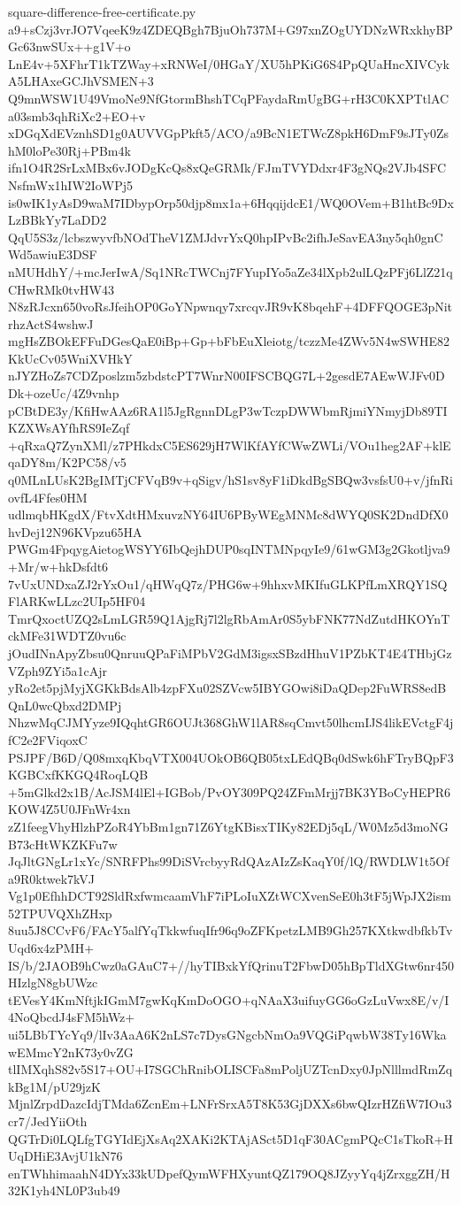 \documentclass[11pt]{article}
\theoremstyle{definition}
\theoremstyle{remark}
\begin{document}
\begin{filecontents*}[overwrite]{square-difference-free-certificate.py}
a9+sCzj3vrJO7VqeeK9z4ZDEQBgh7BjuOh737M+G97xnZOgUYDNzWRxkhyBPGc63nwSUx++g1V+o
LnE4v+5XFhrT1kTZWay+xRNWeI/0HGaY/XU5hPKiG6S4PpQUaHncXIVCykA5LHAxeGCJhVSMEN+3
Q9mnWSW1U49VmoNe9NfGtormBhshTCqPFaydaRmUgBG+rH3C0KXPTtlACa03smb3qhRiXc2+EO+v
xDGqXdEVznhSD1g0AUVVGpPkft5/ACO/a9BcN1ETWcZ8pkH6DmF9sJTy0ZshM0loPe30Rj+PBm4k
ifn1O4R2SrLxMBx6vJODgKcQs8xQeGRMk/FJmTVYDdxr4F3gNQs2VJb4SFCNsfmWx1hIW2IoWPj5
is0wIK1yAsD9waM7IDbypOrp50djp8mx1a+6HqqijdcE1/WQ0OVem+B1htBc9DxLzBBkYy7LaDD2
QqU5S3z/lcbszwyvfbNOdTheV1ZMJdvrYxQ0hpIPvBc2ifhJeSavEA3ny5qh0gnCWd5awiuE3DSF
nMUHdhY/+mcJerIwA/Sq1NRcTWCnj7FYupIYo5aZe34lXpb2ulLQzPFj6LlZ21qCHwRMk0tvHW43
N8zRJcxn650voRsJfeihOP0GoYNpwnqy7xrcqvJR9vK8bqehF+4DFFQOGE3pNitrhzActS4wshwJ
mgHsZBOkEFFuDGesQaE0iBp+Gp+bFbEuXleiotg/tczzMe4ZWv5N4wSWHE82KkUcCv05WniXVHkY
nJYZHoZs7CDZposlzm5zbdstcPT7WnrN00IFSCBQG7L+2gesdE7AEwWJFv0DDk+ozeUc/4Z9vnhp
pCBtDE3y/KfiHwAAz6RA1l5JgRgnnDLgP3wTczpDWWbmRjmiYNmyjDb89TIKZXWsAYfhRS9IeZqf
+qRxaQ7ZynXMl/z7PHkdxC5ES629jH7WlKfAYfCWwZWLi/VOu1heg2AF+klEqaDY8m/K2PC58/v5
q0MLnLUsK2BgIMTjCFVqB9v+qSigv/hS1sv8yF1iDkdBgSBQw3vsfsU0+v/jfnRiovfL4Ffes0HM
udlmqbHKgdX/FtvXdtHMxuvzNY64IU6PByWEgMNMc8dWYQ0SK2DndDfX0hvDej12N96KVpzu65HA
PWGm4FpqygAietogWSYY6IbQejhDUP0sqINTMNpqyIe9/61wGM3g2Gkotljva9+Mr/w+hkDsfdt6
7vUxUNDxaZJ2rYxOu1/qHWqQ7z/PHG6w+9hhxvMKIfuGLKPfLmXRQY1SQFlARKwLLzc2UIp5HF04
TmrQxoctUZQ2sLmLGR59Q1AjgRj7l2lgRbAmAr0S5ybFNK77NdZutdHKOYnTckMFe31WDTZ0vu6c
jOudINnApyZbsu0QnruuQPaFiMPbV2GdM3igsxSBzdHhuV1PZbKT4E4THbjGzVZph9ZYi5a1cAjr
yRo2et5pjMyjXGKkBdsAlb4zpFXu02SZVcw5IBYGOwi8iDaQDep2FuWRS8edBQnL0wcQbxd2DMPj
NhzwMqCJMYyze9IQqhtGR6OUJt368GhW1lAR8sqCmvt50lhcmIJS4likEVctgF4jfC2e2FViqoxC
PSJPF/B6D/Q08mxqKbqVTX004UOkOB6QB05txLEdQBq0dSwk6hFTryBQpF3KGBCxfKKGQ4RoqLQB
+5mGlkd2x1B/AcJSM4lEl+IGBob/PvOY309PQ24ZFmMrjj7BK3YBoCyHEPR6KOW4Z5U0JFnWr4xn
zZ1feegVhyHlzhPZoR4YbBm1gn71Z6YtgKBisxTIKy82EDj5qL/W0Mz5d3moNGB73cHtWKZKFu7w
JqJltGNgLr1xYc/SNRFPhs99DiSVrcbyyRdQAzAIzZsKaqY0f/lQ/RWDLW1t5Ofa9R0ktwek7kVJ
Vg1p0EfhhDCT92SldRxfwmcaamVhF7iPLoIuXZtWCXvenSeE0h3tF5jWpJX2ism52TPUVQXhZHxp
8uu5J8CCvF6/FAcY5alfYqTkkwfuqIfr96q9oZFKpetzLMB9Gh257KXtkwdbfkbTvUqd6x4zPMH+
IS/b/2JAOB9hCwz0aGAuC7+//hyTIBxkYfQrinuT2FbwD05hBpTldXGtw6nr450HIzlgN8gbUWzc
tEVesY4KmNftjkIGmM7gwKqKmDoOGO+qNAaX3uifuyGG6oGzLuVwx8E/v/I4NoQbcdJ4sFM5hWz+
ui5LBbTYcYq9/lIv3AaA6K2nLS7c7DysGNgcbNmOa9VQGiPqwbW38Ty16WkawEMmcY2nK73y0vZG
tlIMXqhS82v5S17+OU+I7SGChRnibOLISCFa8mPoljUZTcnDxy0JpNlllmdRmZqkBg1M/pU29jzK
MjnlZrpdDazcIdjTMda6ZcnEm+LNFrSrxA5T8K53GjDXXs6bwQIzrHZfiW7IOu3cr7/JedYiiOth
QGTrDi0LQLfgTGYIdEjXsAq2XAKi2KTAjASct5D1qF30ACgmPQcC1sTkoR+HUqDHiE3AvjU1kN76
enTWhhimaahN4DYx33kUDpefQymWFHXyuntQZ179OQ8JZyyYq4jZrxggZH/H32K1yh4NL0P3ub49

\end{filecontents*}
\end{document}
